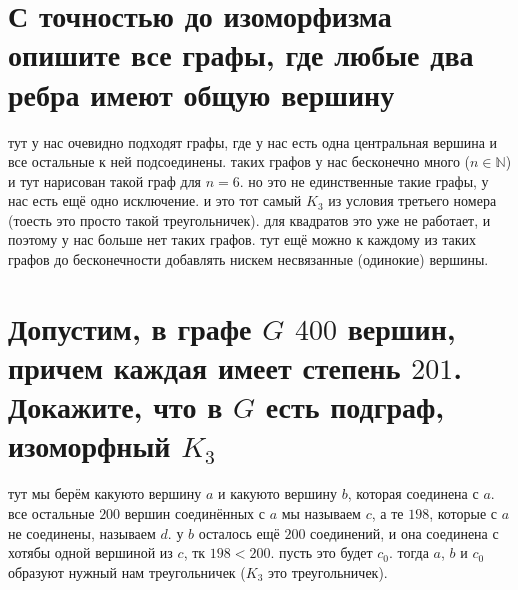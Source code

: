 \documentclass{article}
\newcommand{\N}{\mathbb{N}}
\begin{document}
  \section{С точностью до изоморфизма опишите все графы, где любые два ребра имеют общую вершину}
  \begin{figure}
    \vspace{-1cm}
    \hfill
    \vspace{-.5cm}
  \end{figure}
  тут у нас очевидно подходят графы, где у нас есть одна центральная вершина и все остальные к ней подсоединены.
  таких графов у нас бесконечно много ($n \in \N$) и тут нарисован такой граф для $n=6$.
  но это не единственные такие графы, у нас есть ещё одно исключение.
  и это тот самый $K_3$ из условия третьего номера (тоесть это просто такой треугольничек).
  для квадратов это уже не работает, и поэтому у нас больше нет таких графов.
  тут ещё можно к каждому из таких графов до бесконечности добавлять нискем несвязанные (одинокие) вершины.

  \section{Допустим, в графе $G$ $400$ вершин, причем каждая имеет степень $201$. Докажите, что в $G$ есть подграф, изоморфный $K_3$}
  \begin{figure}
    \vspace{-1cm}
    \hfill
    \vspace{-1cm}
  \end{figure}
  тут мы берём какуюто вершину $a$ и какуюто вершину $b$, которая соединена с $a$.
  все остальные $200$ вершин соединённых с $a$ мы называем $c$,
  а те $198$, которые с $a$ не соединены, называем $d$.
  у $b$ осталось ещё $200$ соединений, и она соединена с хотябы одной вершиной из $c$, тк $198 < 200$.
  пусть это будет $c_0$.
  тогда $a$, $b$ и $c_0$ образуют нужный нам треугольничек ($K_3$ это треугольничек).
\end{document}

